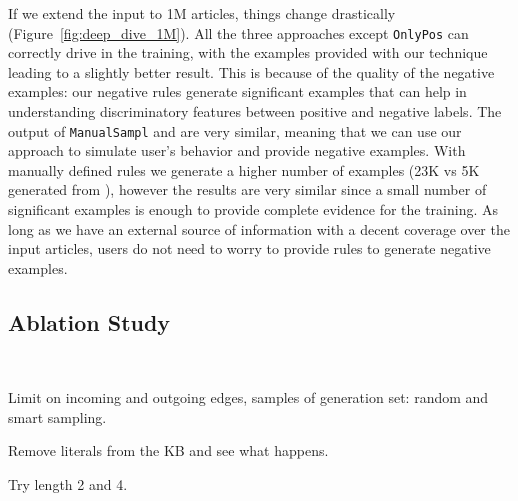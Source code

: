 If we extend the input to 1M articles, things change drastically (Figure~\ref{fig:deep_dive_1M}). All the three approaches except \texttt{OnlyPos} can correctly drive \deepdive in the training, with the examples provided with our technique leading to a slightly better result. This is because of the quality of the negative examples: our negative rules generate significant examples that can help \deepdive in understanding discriminatory features between positive and negative labels.
The output of \texttt{ManualSampl} and \sys are very similar, meaning that we can use our approach to simulate user's behavior and provide negative examples. With manually defined rules we generate a higher number of examples (23K vs 5K generated from \dbpedia), however the results are very similar since a small number of significant examples is enough to provide complete evidence for the training. As long as we have an external source of information with a decent coverage over the input articles, users do not need to worry to provide rules to generate negative examples.

\subsection{Ablation Study} ~\label{sec:int_evaluation}

Limit on incoming and outgoing edges, samples of generation set: random and smart sampling.

Remove literals from the KB and see what happens.

 Try length 2 and 4.